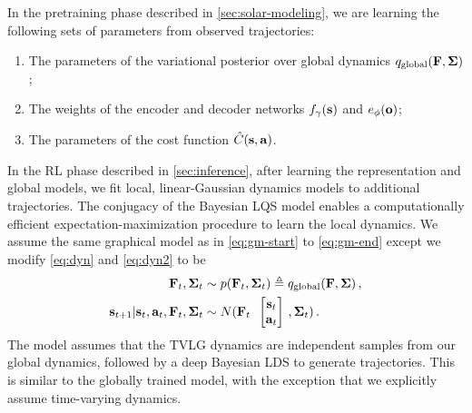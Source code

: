 In the pretraining phase described in \autoref{sec:solar-modeling}, we are learning the following sets of parameters from observed trajectories:
\vspace{-.5em}
\begin{enumerate}
    \itemsep0em
    \item The parameters of the variational posterior over global dynamics $q_\textrm{global}(\mathbf{F}, \bm{\Sigma})$;
    \item The weights of the encoder and decoder networks $f_\gamma(\mathbf{s})$ and $e_\phi(\mathbf{o})$;
    \item The parameters of the cost function $\hat{C}(\mathbf{s}, \mathbf{a})$.
\end{enumerate}
\vspace{-.5em}
In the RL phase described in \autoref{sec:inference}, after learning the representation and global models, we fit local, linear-Gaussian dynamics models to additional trajectories. The conjugacy of the Bayesian LQS model enables a computationally efficient expectation-maximization procedure to learn the local dynamics. We assume the same graphical model as in \autoref{eq:gm-start} to \autoref{eq:gm-end} except we modify \autoref{eq:dyn} and \autoref{eq:dyn2} to be
\begin{align*}
    \dynmat_t, \dyncovar_t &\sim p(\dynmat_t, \dyncovar_t) \triangleq q_{\textrm{global}}(\dynmat, \dyncovar)\,,\\
    \state_{t + 1} | \state_t, \action_t, \dynmat_t, \dyncovar_t &\sim \N(\dynmat_t\colvec{\state_t\\\action_t}, \dyncovar_t)\,.
\end{align*}
The model assumes that the TVLG dynamics are independent samples from our global dynamics, followed by a deep Bayesian LDS to generate trajectories. This is similar to the globally trained model, with the exception that we explicitly assume time-varying dynamics.

